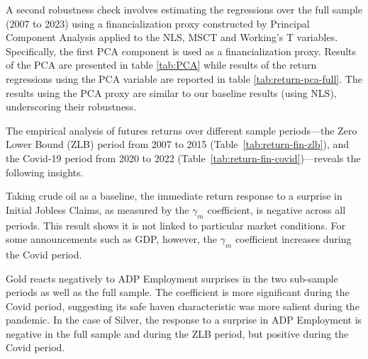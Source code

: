 A second robustness check involves estimating the regressions over the full sample (2007 to 2023)  using a financialization proxy constructed by Principal Component Analysis applied to the  NLS, MSCT and Working's T variables. Specifically, the first PCA component is used as a financialization proxy.   Results of the PCA are presented in table \ref{tab:PCA}  while results of the return regressions using the PCA variable are reported  in table \ref{tab:return-pca-full}. The results using the PCA proxy are similar to our baseline results (using NLS), underscoring their robustness.%

The empirical analysis of futures returns over different sample periods---the Zero Lower Bound (ZLB) period from 2007 to 2015 (Table~\ref{tab:return-fin-zlb}), and the  Covid-19  period from 2020 to 2022 (Table~\ref{tab:return-fin-covid})---reveals the following insights.

Taking crude oil as a baseline, the immediate return response to a surprise in Initial Jobless Claims, as measured by the $\gamma_m$ coefficient, is negative across all periods. This result shows it is not linked to particular market conditions.  For some announcements such as GDP, however, the \( \gamma_m \) coefficient increases during the Covid period.%


Gold reacts negatively to ADP Employment surprises in the two sub-sample periods as well as the full sample. The coefficient is more significant during the Covid period, suggesting its safe haven characteristic was more salient during the pandemic.%
In the case of Silver, the response to a surprise in ADP Employment is negative in the full sample and during the ZLB period, but positive during the Covid period. 

